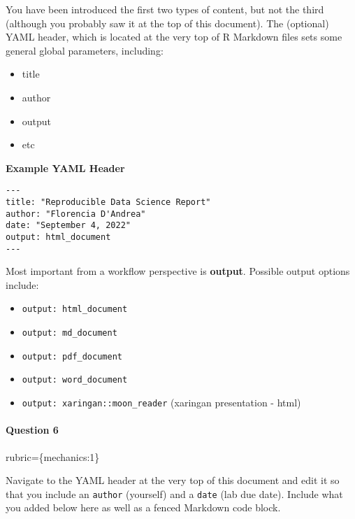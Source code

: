 \documentclass[
]{article}
\providecommand{\tightlist}{%
  \setlength{\itemsep}{0pt}\setlength{\parskip}{0pt}}
\begin{document}
You have been introduced the first two types of content, but not the
third (although you probably saw it at the top of this document). The
(optional) YAML header, which is located at the very top of R Markdown
files sets some general global parameters, including:

\begin{itemize}
\tightlist
\item
  title
\item
  author
\item
  output
\item
  etc
\end{itemize}

\textbf{Example YAML Header}

\begin{verbatim}
---
title: "Reproducible Data Science Report"
author: "Florencia D'Andrea"
date: "September 4, 2022"
output: html_document
---
\end{verbatim}

Most important from a workflow perspective is \textbf{output}. Possible
output options include:

\begin{itemize}
\tightlist
\item
  \texttt{output:\ html\_document}
\item
  \texttt{output:\ md\_document}
\item
  \texttt{output:\ pdf\_document}
\item
  \texttt{output:\ word\_document}
\item
  \texttt{output:\ xaringan::moon\_reader} (xaringan presentation -
  html)
\end{itemize}

\begin{alert alert-info}
\hypertarget{question-6}{%
\paragraph{Question 6}\label{question-6}}

rubric=\{mechanics:1\}

Navigate to the YAML header at the very top of this document and edit it
so that you include an \texttt{author} (yourself) and a \texttt{date}
(lab due date). Include what you added below here as well as a fenced
Markdown code block.
\end{alert alert-info}

\begin{alert alert-info}

\end{alert alert-info}
\end{document}
